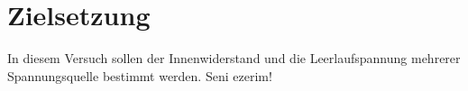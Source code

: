 \setcounter{page}{1}
\section{Zielsetzung}
\label{sec:Zielsetzung}

In diesem Versuch sollen der Innenwiderstand und die Leerlaufspannung mehrerer Spannungsquelle bestimmt werden. Seni ezerim!
